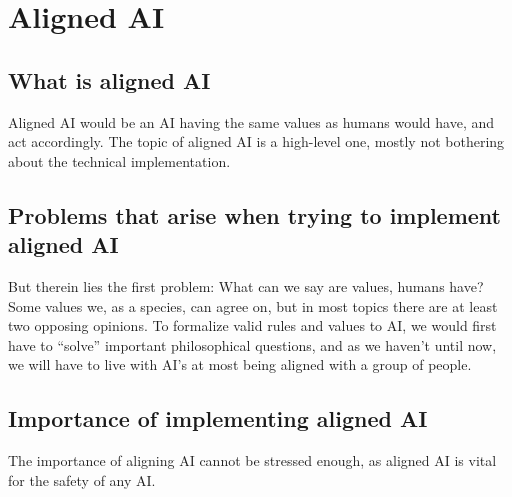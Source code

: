 \chapter{Aligned AI}

\section{What is aligned AI}
Aligned AI would be an AI having the same values as humans would have, and act accordingly. The topic of aligned AI is a high-level one, mostly not bothering about the technical implementation.
\section{Problems that arise when trying to implement aligned AI}
But therein lies the first problem: What can we say are values, humans have? Some values we, as a species, can agree on, but in most topics there are at least two opposing opinions. To formalize valid rules and values to AI, we would first have to “solve” important philosophical questions, and as we haven't until now, we will have to live with AI's at most being aligned with a group of people.
\section{Importance of implementing aligned AI}
The importance of aligning AI cannot be stressed enough, as aligned AI is vital for the safety of any AI.